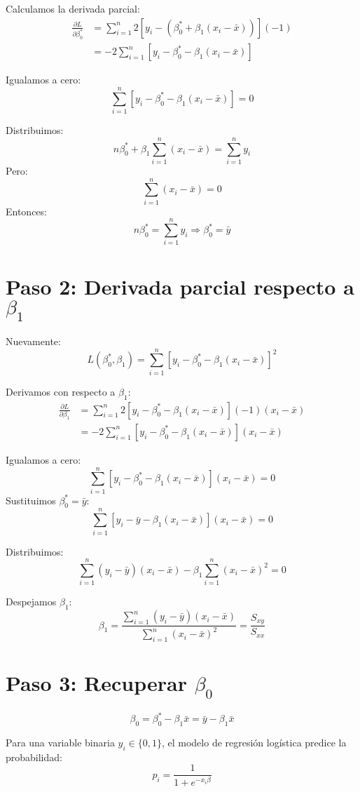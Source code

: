 \documentclass[12pt]{article}
\begin{document}
Calculamos la derivada parcial:
\begin{align*}
\frac{\partial L}{\partial \beta_0^*} &= \sum_{i=1}^{n} 2[y_i - (\beta_0^* + \beta_1(x_i - \bar{x}))](-1) \\
&= -2 \sum_{i=1}^{n} [y_i - \beta_0^* - \beta_1(x_i - \bar{x})]
\end{align*}

Igualamos a cero:
\[
\sum_{i=1}^{n} [y_i - \beta_0^* - \beta_1(x_i - \bar{x})] = 0
\]

Distribuimos:
\[
n \beta_0^* + \beta_1 \sum_{i=1}^{n}(x_i - \bar{x}) = \sum_{i=1}^{n} y_i
\]
Pero:
\[
\sum_{i=1}^{n}(x_i - \bar{x}) = 0
\]
Entonces:
\[
n \beta_0^* = \sum_{i=1}^{n} y_i \Rightarrow \beta_0^* = \bar{y}
\]

\section*{Paso 2: Derivada parcial respecto a \( \beta_1 \)}
Nuevamente:
\[
L(\beta_0^*, \beta_1) = \sum_{i=1}^{n} [y_i - \beta_0^* - \beta_1(x_i - \bar{x})]^2
\]

Derivamos con respecto a $\beta_1$:
\begin{align*}
\frac{\partial L}{\partial \beta_1} &= \sum_{i=1}^{n} 2[y_i - \beta_0^* - \beta_1(x_i - \bar{x})](-1)(x_i - \bar{x}) \\
&= -2 \sum_{i=1}^{n} [y_i - \beta_0^* - \beta_1(x_i - \bar{x})](x_i - \bar{x})
\end{align*}

Igualamos a cero:
\[
\sum_{i=1}^{n} [y_i - \beta_0^* - \beta_1(x_i - \bar{x})](x_i - \bar{x}) = 0
\]
Sustituimos $\beta_0^* = \bar{y}$:
\[
\sum_{i=1}^{n} [y_i - \bar{y} - \beta_1(x_i - \bar{x})](x_i - \bar{x}) = 0
\]

Distribuimos:
\[
\sum_{i=1}^{n} (y_i - \bar{y})(x_i - \bar{x}) - \beta_1 \sum_{i=1}^{n} (x_i - \bar{x})^2 = 0
\]

Despejamos $\beta_1$:
\[
\beta_1 = \frac{\sum_{i=1}^{n} (y_i - \bar{y})(x_i - \bar{x})}{\sum_{i=1}^{n} (x_i - \bar{x})^2} = \frac{S_{xy}}{S_{xx}}
\]

\section*{Paso 3: Recuperar \( \beta_0 \)}
\[
\beta_0 = \beta_0^* - \beta_1 \bar{x} = \bar{y} - \beta_1 \bar{x}
\]


Para una variable binaria $y_i \in \{0,1\}$, el modelo de regresión logística predice la probabilidad:
\[
    p_i = \frac{1}{1 + e^{-x_i \beta}}
\]
\end{document}
